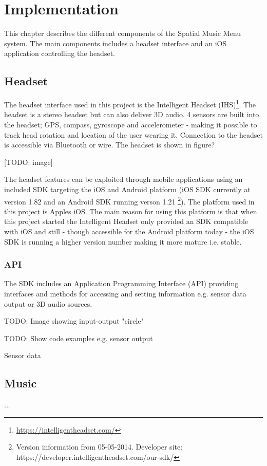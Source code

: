 \chapter{Implementation}
This chapter describes the different components of the Spatial Music Menu system. The main components includes a headset interface and an iOS application controlling the headset.

\section{Headset}
The headset interface used in this project is the Intelligent Headset (IHS)\footnote{\url{https://intelligentheadset.com/}}. The headset is a stereo headset but can also deliver 3D audio. 4 sensors are built into the headset; GPS, compass, gyroscope and accelerometer - making it possible to track head rotation and location of the user wearing it. Connection to the headset is accessible via Bluetooth or wire. The headset is shown in figure?

[TODO: image]



The headset features can be exploited through mobile applications using an included SDK targeting the iOS and Android platform (iOS SDK currently at version 1.82 and an Android SDK running verson 1.21 \footnote{Version information from 05-05-2014. Developer site: https://developer.intelligentheadset.com/our-sdk/}). The platform used in this project is Apples iOS. The main reason for using this platform is that when this project started the Intelligent Headset only provided an SDK compatible with iOS and still - though accessible for the Android platform today - the iOS SDK is running a higher version number making it more mature i.e. stable.

\subsection{API}
The SDK includes an Application Programming Interface (API) providing interfaces and methods for accessing and setting information e.g. sensor data output or 3D audio sources.

TODO: Image showing input-output "circle"

TODO: Show code examples e.g. sensor output

Sensor data


\section{Music}
...

